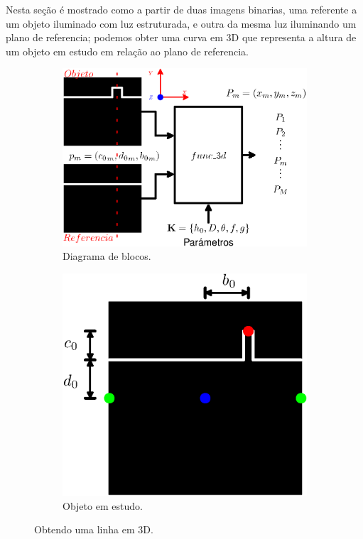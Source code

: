 \documentclass[a4paper, 12pt]{article}
\begin{document}
Nesta seção é mostrado como a partir de duas imagens binarias, 
uma referente a um objeto iluminado com luz estruturada,
e outra da mesma luz iluminando um plano de referencia;
podemos obter uma curva em 3D que representa a altura de um objeto em estudo em relação
ao plano de referencia.
\begin{figure}[!h]
     \centering
     \begin{subfigure}[b]{0.5\textwidth}
         \centering
         \includegraphics[width=\textwidth]{Diagrama3.eps}
         \caption{Diagrama de blocos.}
         \label{fig:blocos:sys}
     \end{subfigure}
     \hfill
     \begin{subfigure}[b]{0.425\textwidth}
         \centering
         \includegraphics[width=\textwidth]{Diagrama2.eps}
         \caption{Objeto em estudo.}
         \label{fig:blocos:obj}
     \end{subfigure}
\caption{Obtendo uma linha em 3D.}
\label{fig:blocos}
\end{figure}
\end{document}
